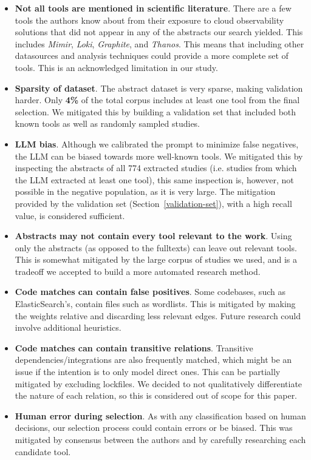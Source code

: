 \documentclass[sigconf]{acmart}
\begin{document}
\begin{itemize}
\item
  \textbf{Not all tools are mentioned in scientific literature}. There
  are a few tools the authors know about from their exposure to cloud
  observability solutions that did not appear in any of the abstracts
  our search yielded. This includes \emph{Mimir}, \emph{Loki},
  \emph{Graphite}, and \emph{Thanos}. This means that including other
  datasources and analysis techniques could provide a more complete set
  of tools. This is an acknowledged limitation in our study.
\item
  \textbf{Sparsity of dataset}. The abstract dataset is very sparse,
  making validation harder. Only \textbf{4\%} of the total corpus
  includes at least one tool from the final selection. We mitigated this
  by building a validation set that included both known tools as well as
  randomly sampled studies.
\item
  \textbf{LLM bias}. Although we calibrated the prompt to minimize false
  negatives, the LLM can be biased towards more well-known tools. We mitigated
  this by inspecting the abstracts of all 774 extracted studies (i.e. studies
  from which the LLM extracted at least one tool), this same inspection is,
  however, not possible in the negative population, as it is very large. The
  mitigation provided by the validation set (Section~\ref{validation-set}), with
  a high recall value, is considered sufficient.
\item
  \textbf{Abstracts may not contain every tool relevant to the work}.
  Using only the abstracts (as opposed to the fulltexts) can leave out
  relevant tools. This is somewhat mitigated by the large corpus of
  studies we used, and is a tradeoff we accepted to build a more
  automated research method.
\item
  \textbf{Code matches can contain false positives}. Some codebases,
  such as ElasticSearch's, contain files such as wordlists. This is
  mitigated by making the weights relative and discarding less relevant
  edges. Future research could involve additional heuristics.
\item
  \textbf{Code matches can contain transitive relations}. Transitive
  dependencies/integrations are also frequently matched, which might be
  an issue if the intention is to only model direct ones. This can be
  partially mitigated by excluding lockfiles. We decided to not
  qualitatively differentiate the nature of each relation, so this is
  considered out of scope for this paper.
\item
  \textbf{Human error during selection}. As with any classification
  based on human decisions, our selection process could contain errors
  or be biased. This was mitigated by consensus between the authors and
  by carefully researching each candidate tool.
\end{itemize}
\end{document}
